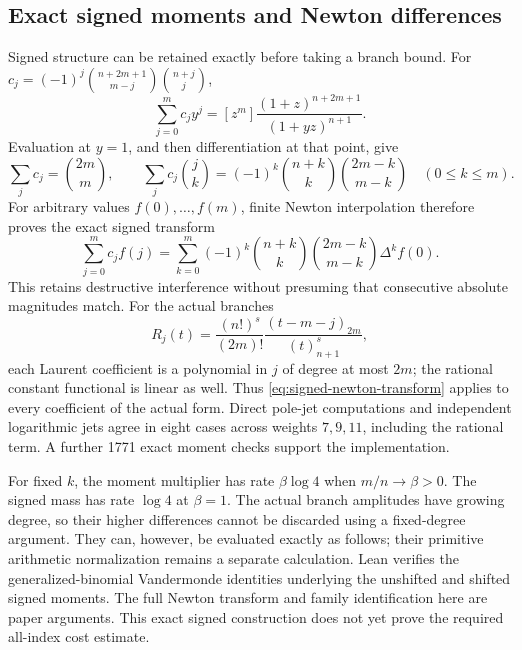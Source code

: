 \documentclass[11pt]{article}
\theoremstyle{remark}
\begin{document}
\subsection{Exact signed moments and Newton differences}
Signed structure can be retained exactly before taking a branch bound.
For \(c_j=(-1)^j\binom{n+2m+1}{m-j}\binom{n+j}{j}\),
\[
 \sum_{j=0}^m c_jy^j
 =[z^m]\frac{(1+z)^{n+2m+1}}{(1+yz)^{n+1}}.
\]
Evaluation at \(y=1\), and then differentiation at that point, give
\[
 \sum_jc_j=\binom{2m}m,\qquad
 \sum_jc_j\binom jk
 =(-1)^k\binom{n+k}k\binom{2m-k}{m-k}\quad(0\le k\le m).
\]
For arbitrary values \(f(0),\ldots,f(m)\), finite Newton interpolation
therefore proves the exact signed transform
\begin{equation}
 \sum_{j=0}^m c_jf(j)
 =\sum_{k=0}^m(-1)^k\binom{n+k}k\binom{2m-k}{m-k}\Delta^kf(0).
 \label{eq:signed-newton-transform}
\end{equation}
This retains destructive interference without presuming that consecutive
absolute magnitudes match. For the actual branches
\[
 R_j(t)=\frac{(n!)^s}{(2m)!}
          \frac{(t-m-j)_{2m}}{(t)_{n+1}^s},
\]
each Laurent coefficient is a polynomial in \(j\) of degree at most
\(2m\); the rational constant functional is linear as well. Thus
\eqref{eq:signed-newton-transform} applies to every coefficient of the
actual form. Direct pole-jet computations and independent logarithmic
jets agree in eight cases across weights \(7,9,11\), including the
rational term. A further 1771 exact moment checks support the implementation.

For fixed \(k\), the moment multiplier has rate \(\beta\log4\) when
\(m/n\to\beta>0\). The signed mass has rate \(\log4\) at \(\beta=1\).
The actual branch amplitudes have growing degree, so their higher
differences cannot be discarded using a fixed-degree argument. They can,
however, be evaluated exactly as follows; their primitive arithmetic
normalization remains a separate calculation.
Lean verifies the generalized-binomial Vandermonde identities underlying
the unshifted and shifted signed moments. The full Newton transform and
family identification here are paper arguments. This exact signed
construction does not yet prove the required all-index cost estimate.
\end{document}
